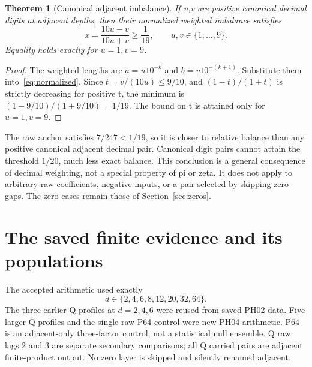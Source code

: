 \documentclass[11pt,a4paper]{article}
\newtheorem{theorem}{Theorem}[section]
\begin{document}
\begin{theorem}[Canonical adjacent imbalance]
If u,v are positive canonical decimal digits at adjacent depths, then their normalized weighted imbalance satisfies
\begin{equation}
x=\frac{10u-v}{10u+v}\ge\frac1{19},
\qquad u,v\in\{1,\ldots,9\}.
\label{eq:canonicalbound}
\end{equation}
Equality holds exactly for $u=1,v=9$.
\end{theorem}
\begin{proof}
The weighted lengths are $a=u10^{-k}$ and $b=v10^{-(k+1)}$. Substitute them into~\eqref{eq:normalized}. Since $t=v/(10u)\le9/10$, and $(1-t)/(1+t)$ is strictly decreasing for positive t, the minimum is $(1-9/10)/(1+9/10)=1/19$. The bound on t is attained only for $u=1,v=9$.
\end{proof}
The raw anchor satisfies $7/247<1/19$, so it is closer to relative balance than any positive canonical adjacent decimal pair. Canonical digit pairs cannot attain the threshold $1/20$, much less exact balance. This conclusion is a general consequence of decimal weighting, not a special property of pi or zeta. It does not apply to arbitrary raw coefficients, negative inputs, or a pair selected by skipping zero gaps. The zero cases remain those of Section~\ref{sec:zeros}.

\clearpage
\section{The saved finite evidence and its populations}
\label{sec:scan}
The accepted arithmetic used exactly
\begin{equation}
d\in\{2,4,6,8,12,20,32,64\}.
\label{eq:schedule}
\end{equation}
The three earlier Q profiles at $d=2,4,6$ were reused from saved PH02 data. Five larger Q profiles and the single raw P64 control were new PH04 arithmetic. P64 is an adjacent-only three-factor control, not a statistical null ensemble. Q raw lags 2 and 3 are separate secondary comparisons; all Q carried pairs are adjacent finite-product output. No zero layer is skipped and silently renamed adjacent.
\end{document}

